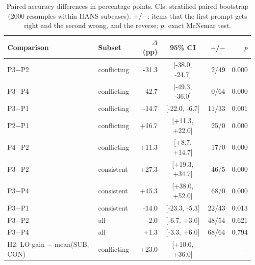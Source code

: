 \begin{table}[t]
\centering
\small
\begin{tabular}{llrcrr}
\toprule
Comparison & Subset & $\Delta$ (pp) & 95\% CI & $+$/$-$ & $p$ \\
\midrule
P3$-$P2 & conflicting & -31.3 & [-38.0, -24.7] & 2/49 & 0.000 \\
P3$-$P4 & conflicting & -42.7 & [-49.3, -36.0] & 0/64 & 0.000 \\
P3$-$P1 & conflicting & -14.7 & [-22.0, -6.7] & 11/33 & 0.001 \\
P2$-$P1 & conflicting & +16.7 & [+11.3, +22.0] & 25/0 & 0.000 \\
P4$-$P2 & conflicting & +11.3 & [+8.7, +14.7] & 17/0 & 0.000 \\
P3$-$P2 & consistent & +27.3 & [+19.3, +34.7] & 46/5 & 0.000 \\
P3$-$P4 & consistent & +45.3 & [+38.0, +52.0] & 68/0 & 0.000 \\
P3$-$P1 & consistent & -14.0 & [-23.3, -5.3] & 22/43 & 0.013 \\
P3$-$P2 & all & -2.0 & [-6.7, +3.0] & 48/54 & 0.621 \\
P3$-$P4 & all & +1.3 & [-3.3, +6.0] & 68/64 & 0.794 \\
\midrule
H2: LO gain $-$ mean(SUB, CON) & conflicting & +23.0 & [+10.0, +36.0] & -- & -- \\
\bottomrule
\end{tabular}
\caption{Paired accuracy differences in percentage points. CIs: stratified paired bootstrap (2000 resamples within HANS subcases). $+$/$-$: items that the first prompt gets right and the second wrong, and the reverse; $p$: exact McNemar test.}
\label{tab:tests}
\end{table}
